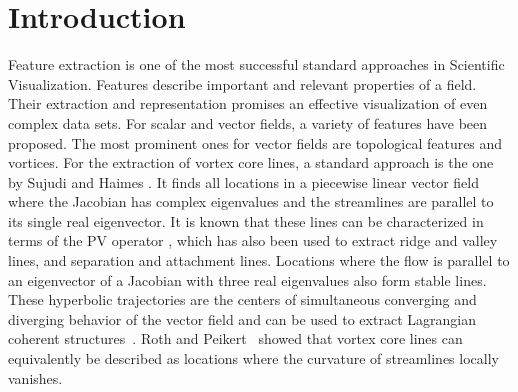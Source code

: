 
%
\section{Introduction} %
\label{sec:tcl_introduction}
%
Feature extraction is one of the most successful standard approaches in
Scientific Visualization.
%
Features describe important and relevant properties of a field.
%
Their extraction and representation promises an effective visualization of even
complex data sets.
%
For scalar and vector fields, a variety of features have been proposed.
%
The most prominent ones for vector fields are topological features and vortices.
%
For the extraction of vortex core lines, a standard approach is the one by
Sujudi and Haimes \cite{Sujudi1995}.
%
It finds all locations in a piecewise linear vector field where the Jacobian has
complex eigenvalues and the streamlines are parallel to its single real
eigenvector.
%
It is known that these lines can be characterized in terms of the \ac{PV}
operator \cite{Peikert1999}, which has also been used to extract ridge and
valley lines, and separation and attachment lines.
%
Locations where the flow is parallel to an eigenvector of a Jacobian with three
real eigenvalues also form stable lines.
%
These hyperbolic trajectories are the centers of simultaneous converging and
diverging behavior of the vector field and can be used to extract Lagrangian
coherent structures~\cite{Machado2013,Machado2016}.
%
Roth and Peikert~\cite{Roth1998} showed that vortex core lines can equivalently
be described as locations where the curvature of streamlines locally vanishes.
%

